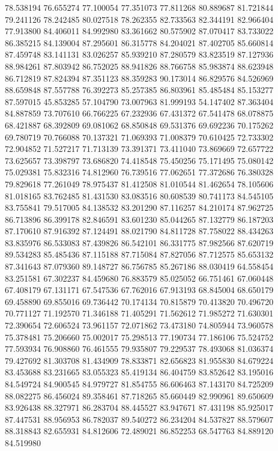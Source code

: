 78.538194
76.655274
77.100054
77.351073
77.811268
80.889687
81.721844
79.241126
78.242485
80.027518
78.262355
82.733563
82.344191
82.966404
77.913800
84.406011
84.992980
83.361662
80.575902
87.070417
83.733022
86.385215
84.139004
87.295601
86.315778
84.204021
87.402705
85.660814
87.459748
83.141131
83.026257
85.939210
87.280579
83.823519
87.127936
88.984261
87.803942
86.752025
88.941826
88.766758
85.983874
88.623948
86.712819
87.824394
87.351123
88.359283
90.173014
86.829576
84.526969
88.659848
87.557788
76.392273
85.257385
86.803961
85.485484
85.153277
87.597015
45.853285
57.104790
73.007963
81.999193
54.147402
87.363404
84.887859
73.707610
66.766225
67.232936
67.431372
67.541478
68.078875
68.421887
68.392809
69.081062
68.850848
69.531376
69.692236
70.175262
69.780719
70.766088
70.137321
71.069393
71.008379
70.610425
72.733302
72.904852
71.527217
71.713139
73.391371
73.411040
73.869669
72.657722
73.625657
73.398797
73.686820
74.418548
75.450256
75.171495
75.080142
75.029381
75.832316
74.812960
76.739516
77.062651
77.372686
76.380328
79.829618
77.261049
78.975437
81.412508
81.010544
81.462654
78.105606
81.018165
83.762485
81.431530
83.083516
80.608539
80.741173
84.545105
83.755841
79.517005
84.138532
83.201290
87.116257
84.210174
87.962725
86.713896
86.399178
82.846591
83.601230
85.044265
87.132779
86.187203
87.170610
87.916392
87.124491
88.021790
84.811728
87.758022
88.434263
83.835976
86.533083
87.439826
86.542101
86.331775
87.982566
87.620719
89.534283
85.485436
87.115188
87.715084
87.827056
87.712575
85.653132
87.341643
87.079360
89.148727
86.756785
85.267186
88.030419
64.558454
83.251581
67.302237
84.459680
76.883579
85.025052
66.751461
67.060448
67.408179
67.131171
67.547536
67.762016
67.913193
68.845004
68.650179
69.458890
69.855016
69.736442
70.174134
70.815879
70.413820
70.496720
70.771127
71.192570
71.346188
71.405291
71.562612
71.985272
71.630301
72.390654
72.606524
73.961157
72.071862
73.473180
74.805944
73.960578
75.378481
75.206660
75.002017
75.298513
77.190734
77.186106
75.524752
77.593934
76.908860
76.461555
79.935807
79.229537
78.493068
81.036374
79.427692
81.303708
81.434909
78.833871
82.656823
81.955830
84.679224
83.453688
83.231665
83.055323
85.419134
86.404759
83.852642
83.195016
84.549724
84.900545
84.979727
81.854755
86.606463
87.143170
84.725209
88.082275
86.456024
89.358461
87.718265
85.660449
82.990961
89.650609
83.926438
88.327971
86.283704
88.445527
83.947671
87.431198
85.925017
87.447531
88.956953
86.782037
89.540272
86.234204
84.537827
88.579607
88.318843
82.655931
84.812606
72.489021
86.852253
68.547763
84.889120
84.519980
